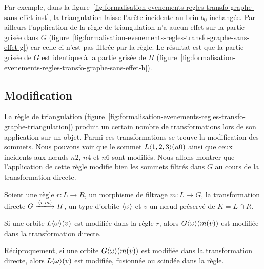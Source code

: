 Par exemple, dans la
figure~\ref{fig:formalisation-evenements-regles-transfo-graphe-sans-effet-inst},
la triangulation laisse l'arête incidente au brin $b_0$ inchangée. %
Par ailleurs l'application de la règle de triangulation n'a aucun effet sur la
partie grisée dans $G$
(figure~\ref{fig:formalisation-evenements-regles-transfo-graphe-sans-effet-g})
car celle-ci n'est pas filtrée par la règle. %
Le résultat est que la partie grisée de $G$ est identique à la partie grisée de
$H$
(figure~\ref{fig:formalisation-evenements-regles-transfo-graphe-sans-effet-h}). %

\subsection{Modification}
\label{sec:formalisation-evenements-regles-transfo-graphe-modification}


La règle de triangulation
(figure~\ref{fig:formalisation-evenements-regles-transfo-graphe-triangulation})
produit un certain nombre de transformations lors de son application sur un
objet. %
Parmi ces transformations se trouve la modification des sommets. %
Nous pouvons voir que le sommet $L\langle1,2,3\rangle(n0)$ ainsi que ceux incidents
aux n\oe uds $n2$, $n4$ et $n6$ sont modifiés. %
Nous allons montrer que l'application de cette règle modifie bien les sommets
filtrés dans $G$ au cours de la transformation directe. %

\begin{proposition}
	\label{prop:base-rule-modify}
	Soient une règle $r : L \longrightarrow R$, un morphisme de filtrage $m : L \rightarrow G$, la transformation directe $G \xlongrightarrow{(r,m)} H$, un type d'orbite $\langle\omega\rangle$ et $v$ un n\oe ud préservé de $K = L \cap R$.

	Si une orbite $L\langle\omega\rangle(v)$ est modifiée
	dans la règle $r$, alors $G\langle\omega\rangle(m(v))$ est
	modifiée dans la transformation directe.

	Réciproquement, si une orbite $G\langle\omega\rangle(m(v))$ est modifiée dans la transformation directe, alors $L\langle\omega\rangle(v)$ est modifiée, fusionnée ou scindée dans la règle.
\end{proposition}

